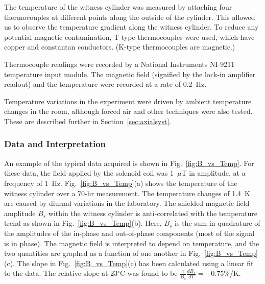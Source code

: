 The temperature of the witness cylinder was measured by attaching four
thermocouples at different points along the outside of the cylinder.
This allowed us to observe the temperature gradient along the witness
cylinder.  To reduce any potential magnetic contamination, T-type
thermocouples were used, which have copper and constantan conductors.
(K-type thermocouples are magnetic.)

Thermocouple readings were recorded by a National Instruments NI-9211
temperature input module.  The magnetic field (signified by the
lock-in amplifier readout) and the temperature were recorded at a rate
of 0.2~Hz.

Temperature variations in the experiment were driven by ambient
temperature changes in the room, although forced air and other
techniques were also tested.  These are described further in
Section~\ref{sec:axialsyst}.


\subsubsection{Data and Interpretation\label{sec:axialsyst}}

An example of the typical data acquired is shown in
Fig.~\ref{fig:B_vs_Temp}.  For these data, the field applied by the
solenoid coil was 1~$\mu$T in amplitude, at a frequency of 1~Hz.
Fig.~\ref{fig:B_vs_Temp}(a) shows the temperature of the witness
cylinder over a 70-hr measurement.  The temperature changes of 1.4~K
are caused by diurnal variations in the laboratory.  The shielded
magnetic field amplitude $B_s$ within the witness cylinder is
anti-correlated with the temperature trend as shown in
Fig.~\ref{fig:B_vs_Temp}(b).  Here, $B_s$ is the sum in quadrature of
the amplitudes of the in-phase and out-of-phase components (most of
the signal is in phase).  The magnetic field is interpreted to depend
on temperature, and the two quantities are graphed as a function of
one another in Fig.~\ref{fig:B_vs_Temp}(c).  The slope in
Fig.~\ref{fig:B_vs_Temp}(c) has been calculated using a linear fit to
the data.  The relative slope at 23$^\circ$C was found to be
$\frac{1}{B_s}\frac{dB_s}{dT}=-0.75\%$/K.

